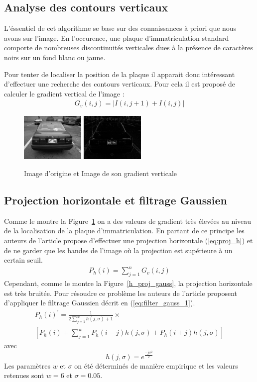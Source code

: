 \documentclass[a4paper,10pt,twocolumn]{article}
\begin{document}
\subsection{Analyse des contours verticaux}
L'éssentiel de cet algorithme se base sur des connaissances à priori que nous avons sur l'image. En l'occurence, une plaque d'immatriculation standard comporte de nombreuses discontinuités verticales dues à la présence de caractères noirs sur un fond blanc ou jaune.

Pour tenter de localiser la position de la plaque il apparait donc intéressant d'effectuer une recherche des contours verticaux. Pour cela il est proposé de calculer le gradient vertical de l'image :
\begin{align}
  G_v(i, j) = |I(i, j + 1) + I(i, j)|
\end{align}
\begin{figure}[H]
	\centering 
	  \includegraphics[width=115px]{img/991213-006.png}
	  \includegraphics[width=115px]{img/991213-006_grad.png}
	\caption{Image d'origine et Image de son gradient verticale\label{grad}}
\end{figure}

\subsection{Projection horizontale et filtrage Gaussien}
Comme le montre la Figure~\ref{grad} on a des valeurs de gradient très élevées au niveau de la localisation de la plaque d'immatriculation. En partant de ce principe les auteurs de l'article propose d'effectuer une projection horizontale (\ref{eq:proj_h}) et de ne garder que les bandes de l'image où la projection est supérieure à un certain seuil.
\begin{align} \label{eq:proj_h}
  P_h(i) = \sum_{j=1}^{n}G_v(i, j)
\end{align}
Cependant, comme le montre la Figure~\ref{h_proj_gauss}, la projection horizontale est très bruitée. Pour résoudre ce problème les auteurs de l'article proposent d'appliquer le filtrage Gaussien décrit en (\ref{eq:filter_gauss_1}).
\begin{gather} \label{eq:filter_gauss_1}
  P_h(i)^{\prime} = \frac{1}{2 \sum_{j = 1}^{w} h(j, \sigma) + 1} \times\\ 
  \left[ P_h(i) + \sum_{j = 1}^{w} P_h(i - j)h(j, \sigma) + P_h(i + j)h(j, \sigma) \right]\nonumber
\end{gather}
avec 
\[ h(j, \sigma) = e^{\frac{-j\sigma^2}{2}} \]
Les paramètres $w$ et $\sigma$ on été déterminés de manière empirique et les valeurs retenues sont $w = 6$ et $\sigma = 0.05$.
\end{document}
